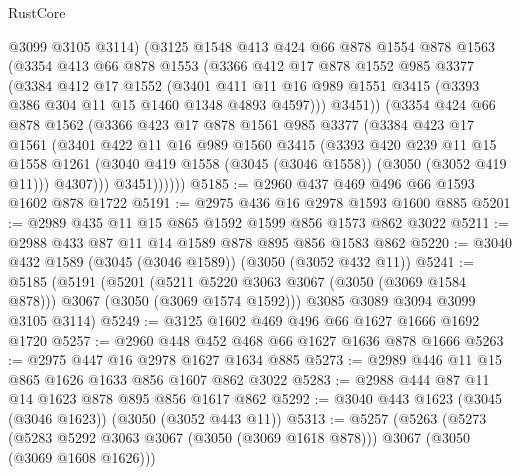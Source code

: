 \begin{lexlean}{RustCore}
\begin{coremodule}
            @3099
            @3105
            @3114)
          (@3125
            @1548
            @413
            @424
            @66
            @878
            @1554
            @878
            @1563
            (@3354
              @413
              @66
              @878
              @1553
              (@3366
                @412
                @17
                @878
                @1552
                @985
                @3377
                (@3384
                  @412
                  @17
                  @1552
                  (@3401
                    @411
                    @11
                    @16
                    @989
                    @1551
                    @3415
                    (@3393 @386 @304 @11 @15 @1460 @1348 @4893 @4597)))
                @3451))
            (@3354
              @424
              @66
              @878
              @1562
              (@3366
                @423
                @17
                @878
                @1561
                @985
                @3377
                (@3384
                  @423
                  @17
                  @1561
                  (@3401
                    @422
                    @11
                    @16
                    @989
                    @1560
                    @3415
                    (@3393
                      @420
                      @239
                      @11
                      @15
                      @1558
                      @1261
                      (@3040 @419 @1558 (@3045 (@3046 @1558)) (@3050 (@3052 @419 @11)))
                      @4307)))
                @3451))))))
@5185 := @2960 @437 @469 @496 @66 @1593 @1602 @878 @1722
@5191 := @2975 @436 @16 @2978 @1593 @1600 @885
@5201 := @2989 @435 @11 @15 @865 @1592 @1599 @856 @1573 @862 @3022
@5211 := @2988 @433 @87 @11 @14 @1589 @878 @895 @856 @1583 @862
@5220 := @3040 @432 @1589 (@3045 (@3046 @1589)) (@3050 (@3052 @432 @11))
@5241 := @5185
    (@5191
      (@5201 (@5211 @5220 @3063 @3067 (@3050 (@3069 @1584 @878))) @3067 (@3050 (@3069 @1574 @1592)))
      @3085
      @3089
      @3094
      @3099
      @3105
      @3114)
@5249 := @3125 @1602 @469 @496 @66 @1627 @1666 @1692 @1720
@5257 := @2960 @448 @452 @468 @66 @1627 @1636 @878 @1666
@5263 := @2975 @447 @16 @2978 @1627 @1634 @885
@5273 := @2989 @446 @11 @15 @865 @1626 @1633 @856 @1607 @862 @3022
@5283 := @2988 @444 @87 @11 @14 @1623 @878 @895 @856 @1617 @862
@5292 := @3040 @443 @1623 (@3045 (@3046 @1623)) (@3050 (@3052 @443 @11))
@5313 := @5257
    (@5263
      (@5273 (@5283 @5292 @3063 @3067 (@3050 (@3069 @1618 @878))) @3067 (@3050 (@3069 @1608 @1626)))

\end{coremodule}
\end{lexlean}
